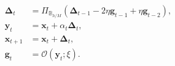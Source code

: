 \documentclass[12pt]{article}
\begin{document}
\[
\begin{aligned}
 \boldsymbol\Delta_t
   &=\Pi_{\mathbb B_{h/M}}
     \!\left(\boldsymbol\Delta_{t-1}
       -2\eta\boldsymbol g_{t-1}+\eta\boldsymbol g_{t-2}\right),\\
 \boldsymbol y_t&=\boldsymbol x_t+\alpha_t\boldsymbol\Delta_t,\\
 \boldsymbol x_{t+1}&=\boldsymbol x_t+\boldsymbol\Delta_t,\\
 \boldsymbol g_t&=\mathcal O(\boldsymbol y_t;\xi).
\end{aligned}
\]
\end{document}
